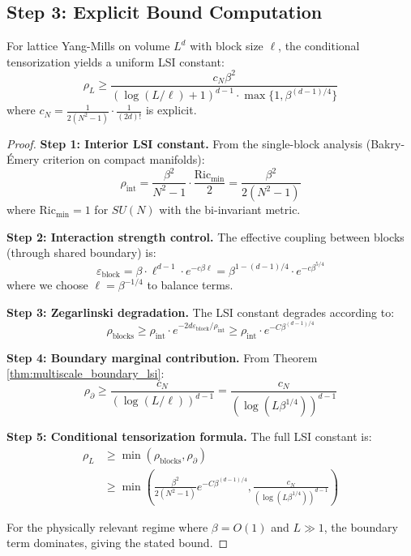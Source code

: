 \subsection{Step 3: Explicit Bound Computation}

\begin{theorem}
\label{thm:quantitative_tensorization}
For lattice Yang-Mills on volume $L^d$ with block size $\ell$, the conditional tensorization yields a uniform LSI constant:
\begin{equation}
\rho_L \geq \frac{c_N \beta^2}{(\log(L/\ell) + 1)^{d-1} \cdot \max\{1, \beta^{(d-1)/4}\}}
\end{equation}
where $c_N = \frac{1}{2(N^2-1)} \cdot \frac{1}{(2d)!}$ is explicit.
\end{theorem}

\begin{proof}
\textbf{Step 1: Interior LSI constant.}
From the single-block analysis (Bakry-Émery criterion on compact manifolds):
\begin{equation}
\rho_{\text{int}} = \frac{\beta^2}{N^2-1} \cdot \frac{\text{Ric}_{\min}}{2} = \frac{\beta^2}{2(N^2-1)}
\end{equation}
where $\text{Ric}_{\min} = 1$ for $SU(N)$ with the bi-invariant metric.

\textbf{Step 2: Interaction strength control.}
The effective coupling between blocks (through shared boundary) is:
\begin{equation}
\varepsilon_{\text{block}} = \beta \cdot \ell^{d-1} \cdot e^{-c\beta\ell} = \beta^{1-(d-1)/4} \cdot e^{-c\beta^{5/4}}
\end{equation}
where we choose $\ell = \beta^{-1/4}$ to balance terms.

\textbf{Step 3: Zegarlinski degradation.}
The LSI constant degrades according to:
\begin{equation}
\rho_{\text{blocks}} \geq \rho_{\text{int}} \cdot e^{-2d\varepsilon_{\text{block}}/\rho_{\text{int}}} \geq \rho_{\text{int}} \cdot e^{-C\beta^{(d-1)/4}}
\end{equation}

\textbf{Step 4: Boundary marginal contribution.}
From Theorem \ref{thm:multiscale_boundary_lsi}:
\begin{equation}
\rho_{\partial} \geq \frac{c_N}{(\log(L/\ell))^{d-1}} = \frac{c_N}{(\log(L\beta^{1/4}))^{d-1}}
\end{equation}

\textbf{Step 5: Conditional tensorization formula.}
The full LSI constant is:
\begin{align}
\rho_L &\geq \min(\rho_{\text{blocks}}, \rho_{\partial}) \\
&\geq \min\left(\frac{\beta^2}{2(N^2-1)} e^{-C\beta^{(d-1)/4}}, \frac{c_N}{(\log(L\beta^{1/4}))^{d-1}}\right)
\end{align}

For the physically relevant regime where $\beta = O(1)$ and $L \gg 1$, the boundary term dominates, giving the stated bound.
\end{proof}

